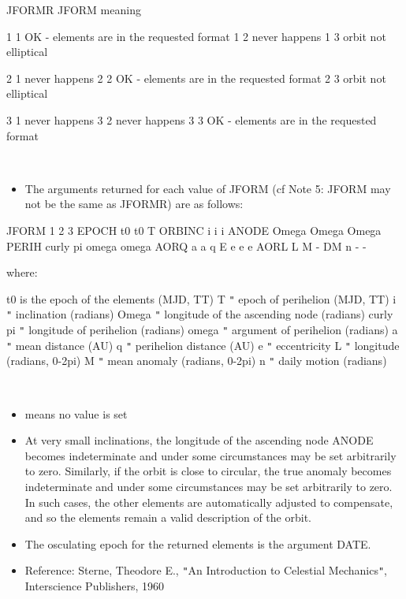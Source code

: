 \documentclass[twoside,11pt]{article}
\renewcommand{\_}{\texttt{\symbol{95}}}
\newcommand{\sstitemlist}[1]{
  \mbox{} \\
  \vspace{-3.5ex}
  \begin{itemize}
     #1
  \end{itemize}
}
\newcommand{\sstitem}{\item}
\newcommand{\sstitemlist}[1]{
      \begin{itemize}
         #1
      \end{itemize}
      \\
   }
\newcommand{\sstitem}{\item}
\begin{document}
{{{      }
         JFORMR   JFORM     meaning

           1        1       OK - elements are in the requested format
           1        2       never happens
           1        3       orbit not elliptical

           2        1       never happens
           2        2       OK - elements are in the requested format
           2        3       orbit not elliptical

           3        1       never happens
           3        2       never happens
           3        3       OK - elements are in the requested format

      \sstitemlist{

         \sstitem
         The arguments returned for each value of JFORM (cf Note 5: JFORM
           may not be the same as JFORMR) are as follows:

      }
          JFORM         1              2              3
          EPOCH         t0             t0             T
          ORBINC        i              i              i
          ANODE         Omega          Omega          Omega
          PERIH         curly pi       omega          omega
          AORQ          a              a              q
          E             e              e              e
          AORL          L              M              -
          DM            n              -              -

        where:

          t0           is the epoch of the elements (MJD, TT)
          T              {\tt "}    epoch of perihelion (MJD, TT)
          i              {\tt "}    inclination (radians)
          Omega          {\tt "}    longitude of the ascending node (radians)
          curly pi       {\tt "}    longitude of perihelion (radians)
          omega          {\tt "}    argument of perihelion (radians)
          a              {\tt "}    mean distance (AU)
          q              {\tt "}    perihelion distance (AU)
          e              {\tt "}    eccentricity
          L              {\tt "}    longitude (radians, 0-2pi)
          M              {\tt "}    mean anomaly (radians, 0-2pi)
          n              {\tt "}    daily motion (radians)
      \sstitemlist{

         \sstitem
             means no value is set

         \sstitem
         At very small inclinations, the longitude of the ascending node
           ANODE becomes indeterminate and under some circumstances may be
           set arbitrarily to zero.  Similarly, if the orbit is close to
           circular, the true anomaly becomes indeterminate and under some
           circumstances may be set arbitrarily to zero.  In such cases,
           the other elements are automatically adjusted to compensate,
           and so the elements remain a valid description of the orbit.

         \sstitem
         The osculating epoch for the returned elements is the argument
           DATE.

         \sstitem
         Reference:  Sterne, Theodore E., {\tt "}An Introduction to Celestial
                       Mechanics{\tt "}, Interscience Publishers, 1960
      }
   }
}
\end{document}
